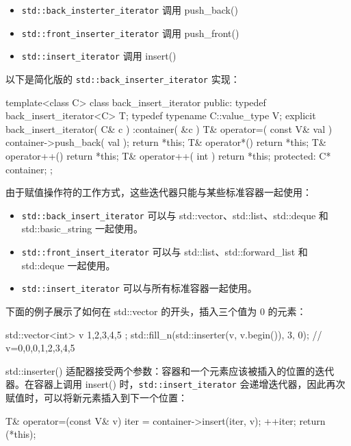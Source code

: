 \begin{itemize}
\item
\verb|std::back_insterter_iterator| 调用  push\_back()

\item
\verb|std::front_inserter_iterator| 调用  push\_front()

\item
\verb|std::insert_iterator| 调用  insert()
\end{itemize}

以下是简化版的 \verb|std::back_inserter_iterator| 实现：

\begin{cpp}
template<class C>
class back_insert_iterator {
public:
    typedef back_insert_iterator<C> T;
    typedef typename C::value_type V;
    explicit back_insert_iterator( C& c ) :container( &c ) { }
    T& operator=( const V& val ) {
        container->push_back( val );
        return *this;
    }
    T& operator*() { return *this; }
    T& operator++() { return *this; }
    T& operator++( int ) { return *this; }
protected:
    C* container;
};
\end{cpp}

由于赋值操作符的工作方式，这些迭代器只能与某些标准容器一起使用：

\begin{itemize}
\item
\verb|std::back_insert_iterator| 可以与 std::vector、std::list、std::deque 和 std::basic\_string 一起使用。

\item
\verb|std::front_insert_iterator| 可以与 std::list、std::forward\_list 和 std::deque 一起使用。

\item
\verb|std::insert_iterator| 可以与所有标准容器一起使用。
\end{itemize}

下面的例子展示了如何在 std::vector 的开头，插入三个值为 0 的元素：

\begin{cpp}
std::vector<int> v{ 1,2,3,4,5 };
std::fill_n(std::inserter(v, v.begin()), 3, 0);
// v={0,0,0,1,2,3,4,5}
\end{cpp}

std::inserter() 适配器接受两个参数：容器和一个元素应该被插入的位置的迭代器。在容器上调用 insert() 时，\verb|std::insert_iterator| 会递增迭代器，因此再次赋值时，可以将新元素插入到下一个位置：

\begin{cpp}
T& operator=(const V& v)
{
    iter = container->insert(iter, v);
    ++iter;
    return (*this);
}
\end{cpp}

